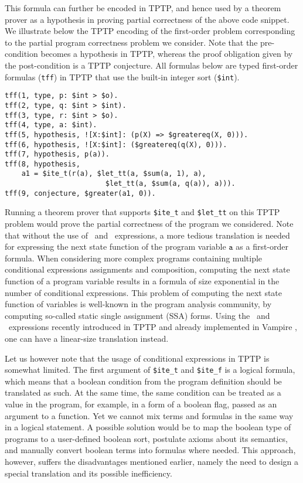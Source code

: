 This formula can further be encoded in TPTP, and hence used by a theorem prover as a hypothesis in proving partial correctness of the above code snippet. We illustrate below the TPTP encoding of the first-order problem corresponding to the partial program correctness problem we consider.  Note that the pre-condition becomes a hypothesis in TPTP, whereas the proof obligation given by the post-condition is a TPTP conjecture. All formulas below are typed first-order formulas (\verb'tff') in TPTP that use the built-in integer sort (\verb'$int').
{\small\begin{lstlisting}[language=tptp]
tff(1, type, p: $int > $o).
tff(2, type, q: $int > $int).
tff(3, type, r: $int > $o).
tff(4, type, a: $int).
tff(5, hypothesis, ![X:$int]: (p(X) => $greatereq(X, 0))).
tff(6, hypothesis, ![X:$int]: ($greatereq(q(X), 0))).
tff(7, hypothesis, p(a)).
tff(8, hypothesis,
    a1 = $ite_t(r(a), $let_tt(a, $sum(a, 1), a),
                        $let_tt(a, $sum(a, q(a)), a))).
tff(9, conjecture, $greater(a1, 0)).
\end{lstlisting}}

Running a theorem prover that supports \verb'$ite_t' and \verb'$let_tt' on this TPTP problem would prove the partial correctness of the program we considered. Note that without the use of \ITE\ and \LETIN\ expressions, a more tedious translation is needed for expressing the next state function of the program variable $\mathtt{a}$ as a first-order formula. When considering more complex programs containing multiple conditional expressions assignments and composition,
computing the next state function of a program variable results in a formula of size exponential in the number of conditional expressions. This problem of computing the next state function of variables is well-known in the program analysis community, by computing so-called static single assignment (SSA) forms. Using the \ITE\ and \LETIN\ expressions recently introduced in TPTP and already implemented in Vampire \cite{PSI14}, one can have a linear-size translation instead.

Let us however note that the usage of conditional expressions in TPTP is somewhat limited. The first argument of \verb'$ite_t' and \verb'$ite_f' is a logical formula, which means that a boolean condition from the program definition should be translated as such. At the same time, the same condition can be treated as a value in the program, for example, in a form of a boolean flag, passed as an argument to a function. Yet we cannot mix terms and formulas in the same way in a logical statement.
A possible solution would be to map the boolean type of programs to a user-defined boolean sort, postulate axioms about its semantics, and manually convert boolean terms into formulas where needed. This approach, however, suffers the disadvantages mentioned earlier, namely the need to design a special translation and its possible inefficiency.

